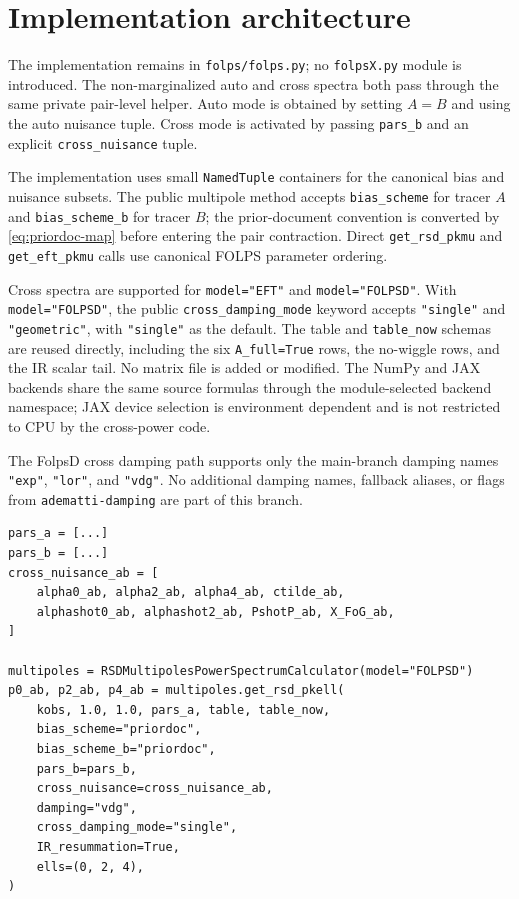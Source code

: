 \documentclass[11pt]{article}
\begin{document}
\section{Implementation architecture}

The implementation remains in \texttt{folps/folps.py}; no \texttt{folpsX.py}
module is introduced.  The non-marginalized auto and cross spectra both pass
through the same private pair-level helper.  Auto mode is obtained by setting
$A=B$ and using the auto nuisance tuple.  Cross mode is activated by passing
\texttt{pars\_b} and an explicit \texttt{cross\_nuisance} tuple.

The implementation uses small \texttt{NamedTuple} containers for the canonical
bias and nuisance subsets.  The public multipole method accepts
\texttt{bias\_scheme} for tracer $A$ and \texttt{bias\_scheme\_b} for tracer
$B$; the prior-document convention is converted by \eqref{eq:priordoc-map}
before entering the pair contraction.  Direct \texttt{get\_rsd\_pkmu} and
\texttt{get\_eft\_pkmu} calls use canonical FOLPS parameter ordering.

Cross spectra are supported for \texttt{model="EFT"} and
\texttt{model="FOLPSD"}.  With \texttt{model="FOLPSD"}, the public
\texttt{cross\_damping\_mode} keyword accepts \texttt{"single"} and
\texttt{"geometric"}, with \texttt{"single"} as the default.  The table and
\texttt{table\_now} schemas are reused directly,
including the six \texttt{A\_full=True} rows, the no-wiggle rows, and the IR
scalar tail.  No matrix file is added or modified.  The NumPy and JAX backends
share the same source formulas through the module-selected backend namespace;
JAX device selection is environment dependent and is not restricted to CPU by
the cross-power code.

The FolpsD cross damping path supports only the main-branch damping names
\texttt{"exp"}, \texttt{"lor"}, and \texttt{"vdg"}.  No additional damping
names, fallback aliases, or flags from \texttt{adematti-damping} are part of
this branch.

\begin{verbatim}
pars_a = [...]
pars_b = [...]
cross_nuisance_ab = [
    alpha0_ab, alpha2_ab, alpha4_ab, ctilde_ab,
    alphashot0_ab, alphashot2_ab, PshotP_ab, X_FoG_ab,
]

multipoles = RSDMultipolesPowerSpectrumCalculator(model="FOLPSD")
p0_ab, p2_ab, p4_ab = multipoles.get_rsd_pkell(
    kobs, 1.0, 1.0, pars_a, table, table_now,
    bias_scheme="priordoc",
    bias_scheme_b="priordoc",
    pars_b=pars_b,
    cross_nuisance=cross_nuisance_ab,
    damping="vdg",
    cross_damping_mode="single",
    IR_resummation=True,
    ells=(0, 2, 4),
)
\end{verbatim}
\end{document}
